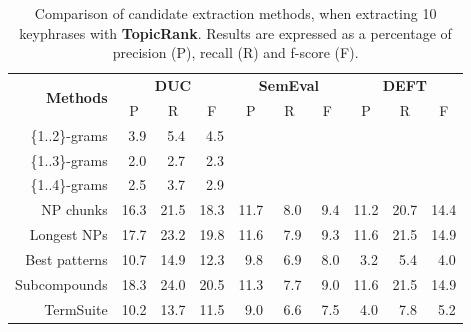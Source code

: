     \begin{table}[h]
      \centering
      \begin{tabular}{rccccccccc}
        \toprule
        \multirow{2}{*}[-2pt]{\textbf{Methods}} & \multicolumn{3}{c}{\textbf{DUC}} & \multicolumn{3}{c}{\textbf{SemEval}} & \multicolumn{3}{c}{\textbf{DEFT}}\\
        \cmidrule(r){2-4}\cmidrule(lr){5-7}\cmidrule(l){8-10}
        & P & R & F & P & R & F & P & R & F\\
        \midrule
        \{1..2\}-grams & $~~$3.9 & $~~$5.4 & $~~$4.5 & & & & & &\\
        \{1..3\}-grams & $~~$2.0 & $~~$2.7 & $~~$2.3 & & & & & &\\
        \{1..4\}-grams & $~~$2.5 & $~~$3.7 & $~~$2.9 & & & & & &\\
        NP chunks & 16.3 & 21.5 & 18.3 & 11.7 & $~~$8.0 & $~~$9.4 & 11.2 & 20.7 & 14.4\\
        Longest NPs & 17.7 & 23.2 & 19.8 & 11.6 & $~~$7.9 & $~~$9.3 & 11.6 & 21.5 & 14.9\\
        Best patterns & 10.7 & 14.9 & 12.3 & $~~$9.8 & $~~$6.9 & $~~$8.0 & $~~$3.2 & $~~$5.4 & $~~$4.0\\
        Subcompounds & 18.3 & 24.0 & 20.5 & 11.3 & $~~$7.7 & $~~$9.0 & 11.6 & 21.5 & 14.9\\
        TermSuite & 10.2 & 13.7 & 11.5 & $~~$9.0 & $~~$6.6 & $~~$7.5 & $~~$4.0 & $~~$7.8 & $~~$5.2\\
        \bottomrule
      \end{tabular}
      \caption{Comparison of candidate extraction methods, when extracting 10
               keyphrases with \textbf{TopicRank}. Results are expressed as a
               percentage of precision (P), recall (R) and f-score (F).
               \label{tab:keyphrase_extraction_results}}
    \end{table}


